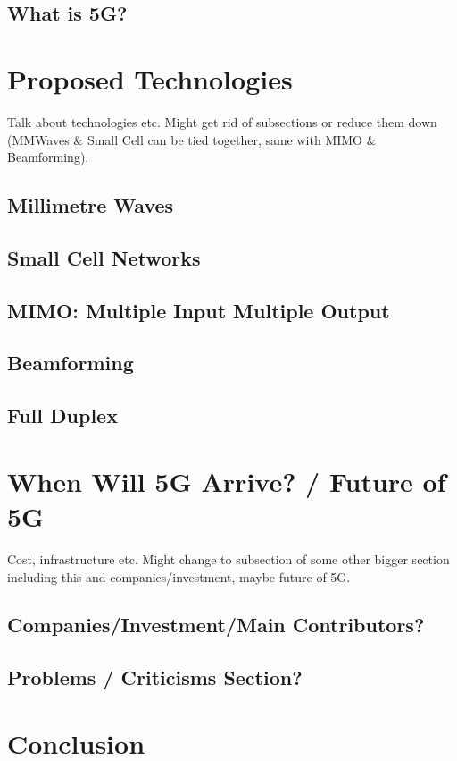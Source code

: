 \documentclass[journal]{IEEEtran}
\begin{document}
\subsection{What is 5G?}



\section{Proposed Technologies}
Talk about technologies etc. Might get rid of subsections or reduce them down (MMWaves \& Small Cell can be tied together, same with MIMO \& Beamforming).
\subsection{Millimetre Waves}
\subsection{Small Cell Networks}
\subsection{MIMO: Multiple Input Multiple Output}
\subsection{Beamforming}
\subsection{Full Duplex}

\section{When Will 5G Arrive? / Future of 5G}
Cost, infrastructure etc. Might change to subsection of some other bigger section including this and companies/investment, maybe future of 5G.
\subsection{Companies/Investment/Main Contributors?}

\subsection{Problems / Criticisms Section?}

\section{Conclusion}

\printbibliography
\end{document}
